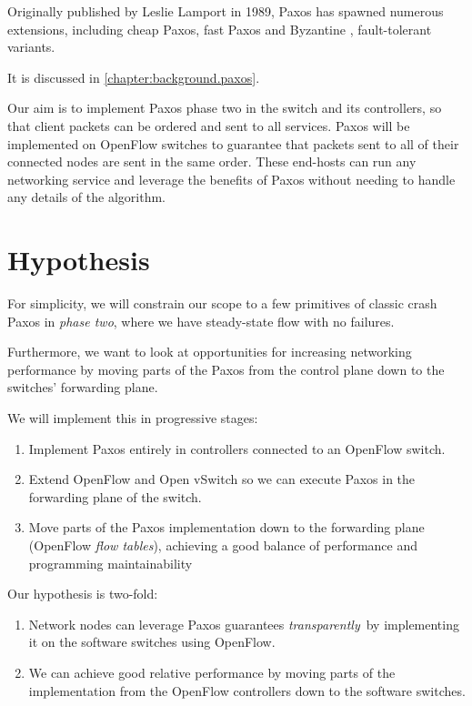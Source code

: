 Originally published by Leslie Lamport in 1989, Paxos
has spawned numerous extensions, including cheap Paxos,
 fast Paxos
 and Byzantine
, fault-tolerant variants.

It is discussed in \vref{chapter:background.paxos}.

Our aim is to implement Paxos phase two in the switch and its controllers,
so that client packets can be ordered and sent to all services.
%
Paxos will be implemented on OpenFlow switches to guarantee that
packets sent to all of their connected nodes are sent in the same order.
These end-hosts can run any networking service and leverage the benefits of
Paxos without needing to handle any details of the algorithm.

\section{Hypothesis}

For simplicity, we will constrain our scope to a few primitives of
classic crash Paxos in \textit{phase two},
where we have steady-state
flow with no failures.

Furthermore, we want to look at opportunities for increasing networking
performance by moving parts of the Paxos from the control
plane down to the switches' forwarding
plane.

We will implement this in progressive stages:

\begin{enumerate}
  \item Implement Paxos entirely in controllers connected to an OpenFlow
  switch.

  \item Extend OpenFlow and Open vSwitch so we can execute Paxos in the
  forwarding plane of the switch.

  \item Move parts of the Paxos implementation down to the forwarding plane
  (OpenFlow \textit{flow tables}), achieving a good balance of performance and
  programming maintainability
\end{enumerate}

Our hypothesis is two-fold:

\begin{enumerate}
\item Network nodes can leverage Paxos guarantees \textit{transparently} by
implementing it on the software switches using OpenFlow.
\item We can achieve good relative performance by moving parts of the
implementation from the OpenFlow controllers down to the software switches.
\end{enumerate}

